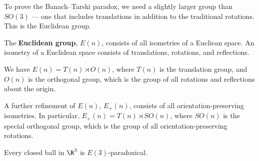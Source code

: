 To prove the Banach--Tarski paradox, we need a slightly larger group than $SO(3)$ --- one that includes translations in addition to the traditional rotations. This is the Euclidean group.
\begin{definition}
  The \textbf{Euclidean group}, $E(n)$, consists of all isometries of a Eucliean space. An isometry of a Euclidean space consists of translations, rotations, and reflections.\newline

  We have $E(n) = T(n) \rtimes O(n)$, where $T(n)$ is the translation group, and $O(n)$ is the orthogonal group, which is the group of all rotations and reflections about the origin.\newline

  A further refinement of $E(n)$, $E_{+}(n)$, consists of all orientation-preserving isometries. In particular, $E_{+}(n) = T(n) \rtimes SO(n)$, where $SO(n)$ is the special orthogonal group, which is the group of all orientation-preserving rotations.
\end{definition}
\begin{corollary}
  Every closed ball in $\R^3$ is $E(3)$-paradoxical.
\end{corollary}

